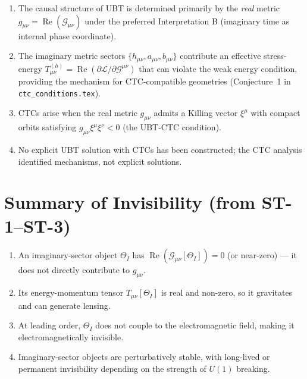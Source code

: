 \documentclass[12pt]{article}
\begin{document}
\begin{enumerate}
  \item The causal structure of UBT is determined primarily by the
    \emph{real} metric $g_{\mu\nu} = \operatorname{Re}(\mathcal{G}_{\mu\nu})$
    under the preferred Interpretation B (imaginary time as internal
    phase coordinate).

  \item The imaginary metric sectors $\{h_{\mu\nu}, a_{\mu\nu},
    b_{\mu\nu}\}$ contribute an effective stress-energy
    $T_{\mu\nu}^{(h)} = \operatorname{Re}(\partial\mathcal{L}/
    \partial\mathcal{G}^{\mu\nu})$ that can violate the weak energy
    condition, providing the mechanism for CTC-compatible geometries
    (Conjecture~1 in \texttt{ctc\_conditions.tex}).

  \item CTCs arise when the real metric $g_{\mu\nu}$ admits a Killing
    vector $\xi^\mu$ with compact orbits satisfying
    $g_{\mu\nu}\xi^\mu\xi^\nu < 0$ (the UBT-CTC condition).

  \item No explicit UBT solution with CTCs has been constructed;
    the CTC analysis identified mechanisms, not explicit solutions.
\end{enumerate}

\section{Summary of Invisibility (from ST-1--ST-3)}

\begin{enumerate}
  \item An imaginary-sector object $\Theta_I$ has
    $\operatorname{Re}(\mathcal{G}_{\mu\nu}[\Theta_I]) = 0$ (or
    near-zero) — it does not directly contribute to $g_{\mu\nu}$.

  \item Its energy-momentum tensor $T_{\mu\nu}[\Theta_I]$ is real
    and non-zero, so it gravitates and can generate lensing.

  \item At leading order, $\Theta_I$ does not couple to the
    electromagnetic field, making it electromagnetically invisible.

  \item Imaginary-sector objects are perturbatively stable, with
    long-lived or permanent invisibility depending on the strength
    of $U(1)$ breaking.
\end{enumerate}
\end{document}
